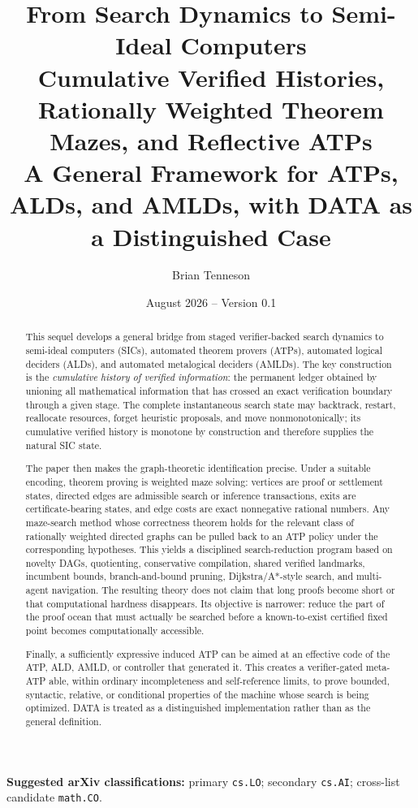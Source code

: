\documentclass[11pt]{article}
\title{\textbf{From Search Dynamics to Semi-Ideal Computers}\\[0.4em]
\Large Cumulative Verified Histories, Rationally Weighted Theorem Mazes, and Reflective ATPs\\[0.6em]
\large A General Framework for ATPs, ALDs, and AMLDs, with DATA as a Distinguished Case}
\author{Brian Tenneson}
\date{August 2026 -- Version 0.1}
\theoremstyle{remark}
\begin{document}
\maketitle

\begin{center}
\textbf{Suggested arXiv classifications:} primary \texttt{cs.LO}; secondary \texttt{cs.AI}; cross-list candidate \texttt{math.CO}.
\end{center}

\begin{abstract}
This sequel develops a general bridge from staged verifier-backed search dynamics to semi-ideal computers (SICs), automated theorem provers (ATPs), automated logical deciders (ALDs), and automated metalogical deciders (AMLDs). The key construction is the \emph{cumulative history of verified information}: the permanent ledger obtained by unioning all mathematical information that has crossed an exact verification boundary through a given stage. The complete instantaneous search state may backtrack, restart, reallocate resources, forget heuristic proposals, and move nonmonotonically; its cumulative verified history is monotone by construction and therefore supplies the natural SIC state.

The paper then makes the graph-theoretic identification precise. Under a suitable encoding, theorem proving is weighted maze solving: vertices are proof or settlement states, directed edges are admissible search or inference transactions, exits are certificate-bearing states, and edge costs are exact nonnegative rational numbers. Any maze-search method whose correctness theorem holds for the relevant class of rationally weighted directed graphs can be pulled back to an ATP policy under the corresponding hypotheses. This yields a disciplined search-reduction program based on novelty DAGs, quotienting, conservative compilation, shared verified landmarks, incumbent bounds, branch-and-bound pruning, Dijkstra/A*-style search, and multi-agent navigation. The resulting theory does not claim that long proofs become short or that computational hardness disappears. Its objective is narrower: reduce the part of the proof ocean that must actually be searched before a known-to-exist certified fixed point becomes computationally accessible.

Finally, a sufficiently expressive induced ATP can be aimed at an effective code of the ATP, ALD, AMLD, or controller that generated it. This creates a verifier-gated meta-ATP able, within ordinary incompleteness and self-reference limits, to prove bounded, syntactic, relative, or conditional properties of the machine whose search is being optimized. DATA is treated as a distinguished implementation rather than as the general definition.
\end{abstract}

\tableofcontents
\clearpage







\end{document}
